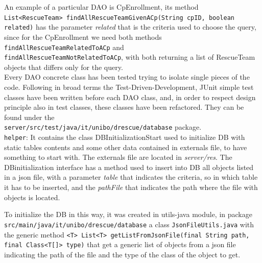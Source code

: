 \documentclass[a4paper,12pt]{report}
\begin{document}
An example of a particular DAO is CpEnrollment, its method \\
\texttt{List<RescueTeam> findAllRescueTeamGivenACp(String cpID, boolean related)} has the parameter \textit{related} that is the criteria used to choose the query, since for the CpEnrollment we need both methods \texttt{findAllRescueTeamRelatedToACp} and \\
\texttt{findAllRescueTeamNotRelatedToACp}, with both returning a list of RescueTeam objects that differs only for the query. \\
Every DAO concrete class has been tested trying to isolate single pieces of the code. Following in broad terms the Test-Driven-Development, JUnit simple test classes have been written before each DAO class, and, in order to respect design principle also in test classes, these classes have been refactored. They can be found under the\\ \texttt{server/src/test/java/it/unibo/drescue/database} package.\\


\texttt{helper}: It contains the class DBInitializationStart used to initialize DB with static tables contents and some other data contained in externals file, to have something to start with.
The externals file are located in \textit{server/res}. The DBinitialization interface has a method used to insert into DB all objects listed in a json file, with a parameter \textit{table} that indicates the criteria, so in which table it has to be inserted, and the \textit{pathFile} that indicates the path where the file with objects is located.

To initialize the DB in this way, it was created in utils-java module, in package \texttt{src/main/java/it/unibo/drescue/database} a class \texttt{JsonFileUtils.java} with the generic method \texttt{<T> List<T> getListFromJsonFile(final String path, \\final Class<T[]> type)} that get a generic list of objects from a json file indicating the path of the file and the type of the class of the object to get.
\end{document}
